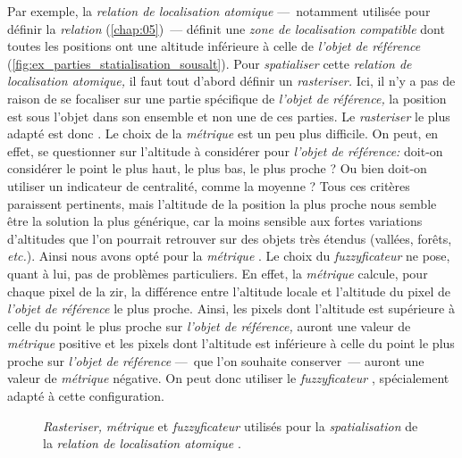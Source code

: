 %   

Par exemple, la \emph{relation de localisation atomique}
 ---~notamment utilisée pour définir
la \emph{relation} 
(\autoref{chap:05})~--- définit une \emph{zone de localisation
  compatible} dont toutes les positions ont une altitude inférieure à
celle de \emph{l'objet de référence}
(\autoref{fig:ex_parties_statialisation_sousalt}). Pour
\emph{spatialiser} cette \emph{relation de localisation atomique,} il
faut tout d'abord définir un \emph{rasteriser.} Ici, il n'y a pas de
raison de se focaliser sur une partie spécifique de \emph{l'objet de
  référence,} la position est sous l'objet dans son ensemble et non
une de ces parties. Le \emph{rasteriser} le plus adapté est donc
. Le choix de la \emph{métrique} est un peu plus
difficile. On peut, en effet, se questionner sur l'altitude à
considérer pour \emph{l'objet de référence:} doit-on considérer le
point le plus haut, le plus bas, le plus proche ? Ou bien doit-on
utiliser un indicateur de centralité, comme la moyenne ? Tous ces
critères paraissent pertinents, mais l'altitude de la position la plus
proche nous semble être la solution la plus générique, car la moins
sensible aux fortes variations d'altitudes que l'on pourrait retrouver
sur des objets très étendus (\eg vallées, forêts, \emph{etc.}). Ainsi
nous avons opté pour la \emph{métrique}
. Le choix du \emph{fuzzyficateur} ne
pose, quant à lui, pas de problèmes particuliers. En effet, la
\emph{métrique}  calcule, pour chaque
pixel de la \ac{zir}, la différence entre l'altitude locale et
l'altitude du pixel de \emph{l'objet de référence} le plus
proche. Ainsi, les pixels dont l'altitude est supérieure à celle du
point le plus proche sur \emph{l'objet de référence,} auront une
valeur de \emph{métrique} positive et les pixels dont l'altitude est
inférieure à celle du point le plus proche sur \emph{l'objet de
  référence} ---~que l'on souhaite conserver~--- auront une valeur de
\emph{métrique} négative. On peut donc utiliser le
\emph{fuzzyficateur} , spécialement adapté à
cette configuration.

\begin{figure}
  \centering
  
  \caption{\emph{Rasteriser,} \emph{métrique} et \emph{fuzzyficateur}
    utilisés pour la \emph{spatialisation} de la \emph{relation de
      localisation atomique}
    \protect{}.}
  \label{fig:ex_parties_statialisation_sousalt}
\end{figure}

